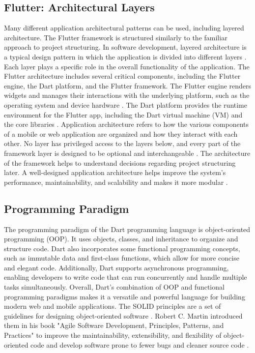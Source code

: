 \subsection{Flutter: Architectural Layers}
Many different application architectural patterns can be used, including layered architecture. The Flutter framework is structured similarly to the familiar approach to project structuring. In software development, layered architecture is a typical design pattern in which the application is divided into different layers \cite{.flutterarchitecture}. Each layer plays a specific role in the overall functionality of the application. The Flutter architecture includes several critical components, including the Flutter engine, the Dart platform, and the Flutter framework. The Flutter engine renders widgets and manages their interactions with the underlying platform, such as the operating system and device hardware \cite{.flutterarchitecture}. The Dart platform provides the runtime environment for the Flutter app, including the Dart virtual machine (VM) and the core libraries \cite{.dartoverview}. Application architecture refers to how the various components of a mobile or web application are organized and how they interact with each other. No layer has privileged access to the layers below, and every part of the framework layer is designed to be optional and interchangeable \cite{.flutterarchitecture}. The architecture of the framework helps to understand decisions regarding project structuring later. A well-designed application architecture helps improve the system's performance, maintainability, and scalability and makes it more modular \cite{.softwarearchi}.

\subsection{Programming Paradigm}
The programming paradigm of the Dart programming language is object-oriented programming (OOP). It uses objects, classes, and inheritance to organize and structure code. Dart also incorporates some functional programming concepts, such as immutable data and first-class functions, which allow for more concise and elegant code. Additionally, Dart supports asynchronous programming, enabling developers to write code that can run concurrently and handle multiple tasks simultaneously. Overall, Dart's combination of OOP and functional programming paradigms makes it a versatile and powerful language for building modern web and mobile applications. The SOLID principles are a set of guidelines for designing object-oriented software \cite{.indeedsolid}. Robert C. Martin introduced them in his book "Agile Software Development, Principles, Patterns, and Practices" to improve the maintainability, extensibility, and flexibility of object-oriented code and develop software prone to fewer bugs and cleaner source code \cite{.martin}.

